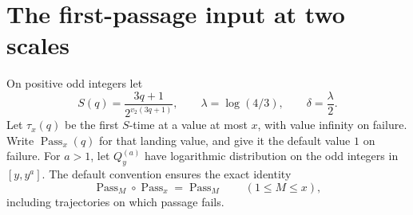 \documentclass[11pt,a4paper]{article}
\begin{document}
\section{The first-passage input at two scales}

On positive odd integers let
\[
 S(q)=\frac{3q+1}{2^{v_2(3q+1)}},\qquad
 \lambda=\log(4/3),\qquad \delta=\frac{\lambda}{2}.
\]
Let \(\tau_x(q)\) be the first \(S\)-time at a value at most \(x\),
with value infinity on failure. Write \(\operatorname{Pass}_x(q)\)
for that landing value, and give it the default value \(1\) on
failure. For \(a>1\), let \(Q_y^{(a)}\) have logarithmic
distribution on the odd integers in \([y,y^a]\).
The default convention ensures the exact identity
\begin{equation}\label{eq:ct-pass-compose}
 \operatorname{Pass}_M\circ\operatorname{Pass}_x
 =\operatorname{Pass}_M\qquad(1\le M\le x),
\end{equation}
including trajectories on which passage fails.
\end{document}
